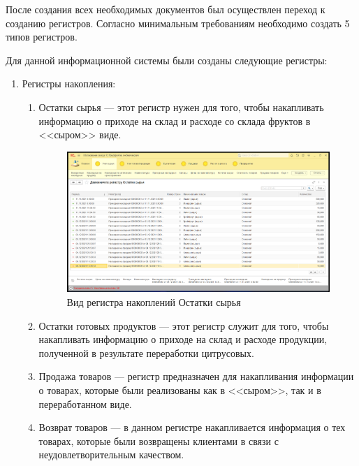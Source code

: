 \documentclass[12pt,a4paper]{article}
\begin{document}
После создания всех необходимых документов был осуществлен переход к созданию регистров. Согласно минимальным требованиям необходимо создать 5 типов регистров.

Для данной информационной системы были созданы следующие регистры:

\begin{enumerate}
    \item Регистры накопления:
    
        \begin{enumerate}
            \item Остатки сырья --- этот регистр нужен для того, чтобы накапливать информацию о приходе на склад и расходе со склада фруктов в <<сыром>> виде.
            
            \begin{figure}[!ht]
                \centering
                \includegraphics[scale=0.4]{Пример регистра накоплений.png}
                \caption{Вид регистра накоплений Остатки сырья}
                \label{fig:accumulation}
            \end{figure}
            
            \item Остатки готовых продуктов --- этот регистр служит для того, чтобы накапливать информацию о приходе на склад и расходе продукции, полученной в результате переработки цитрусовых.
            
            \item Продажа товаров --- регистр предназначен для накапливания информации о товарах, которые были реализованы как в <<сыром>>, так и в переработанном виде.
            
            \item Возврат товаров --- в данном регистре накапливается информация о тех товарах, которые были возвращены клиентами в связи с неудовлетворительным качеством.
            

\end{enumerate}
\end{enumerate}
\end{document}
